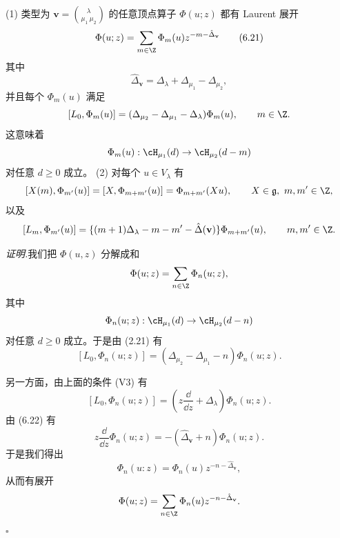 
\begin{proposition}[6.10]
(1) 类型为 $\mathbf{v}=\binom{\lambda}{\mu_1\ \mu_2}$ 的任意顶点算子 $\Phi(u;z)$
都有 Laurent 展开
\begin{equation}
\Phi(u;z)=\sum_{m\in\Z}\Phi_m(u)z^{-m-\hat{\Delta}_{\mathbf{v}}} \tag{6.21}
\end{equation}
其中
\begin{equation}
\hat{\Delta}_{\mathbf{v}}=\Delta_\lambda+\Delta_{\mu_1}-\Delta_{\mu_2}, \tag{6.22}
\end{equation}
并且每个 $\Phi_m(u)$ 满足
\[
[L_0,\Phi_m(u)]=(\Delta_{\mu_2}-\Delta_{\mu_1}-\Delta_\lambda)\Phi_m(u),
\qquad m\in\Z .
\]
这意味着
\[
\Phi_m(u):\cH_{\mu_1}(d)\to\cH_{\mu_2}(d-m)
\]
对任意 $d\ge0$ 成立。
(2) 对每个 $u\in V_\lambda$ 有
\[
[X(m),\Phi_{m'}(u)]=[X,\Phi_{m+m'}(u)]=\Phi_{m+m'}(Xu),
\qquad X\in\mathfrak{g},\ m,m'\in\Z,
\]
以及
\[
[L_m,\Phi_{m'}(u)]=\{(m+1)\Delta_\lambda-m-m'-\hat{\Delta}(\mathbf{v})\}
\Phi_{m+m'}(u),\qquad m,m'\in\Z .
\]
\end{proposition}


\noindent\textit{证明.}\quad 我们把 $\Phi(u,z)$ 分解成和
\[
\Phi(u;z)=\sum_{n\in\Z}\Phi_n(u;z),
\]
其中
\[
\Phi_n(u;z):\cH_{\mu_1}(d)\to\cH_{\mu_2}(d-n)
\]
对任意 $d\ge0$ 成立。于是由 (2.21) 有
\[
[L_0,\Phi_n(u;z)]=(\Delta_{\mu_2}-\Delta_{\mu_1}-n)\Phi_n(u;z).
\]

另一方面，由上面的条件 (V3) 有
\[
[L_0,\Phi_n(u;z)]=\left(z\dfrac{\dd}{\dd z}+\Delta_\lambda\right)\Phi_n(u;z).
\]
由 (6.22) 有
\[
z\dfrac{\dd}{\dd z}\Phi_n(u;z)=-(\hat{\Delta}_{\mathbf{v}}+n)\Phi_n(u;z).
\]
于是我们得出
\[
\Phi_n(u:z)=\Phi_n(u)z^{-n-\hat{\Delta}_{\mathbf{v}}},
\]
从而有展开
\[
\Phi(u;z)=\sum_{n\in\Z}\Phi_n(u)z^{-n-\hat{\Delta}_{\mathbf{v}}}.
\]
\hfill$\square$

